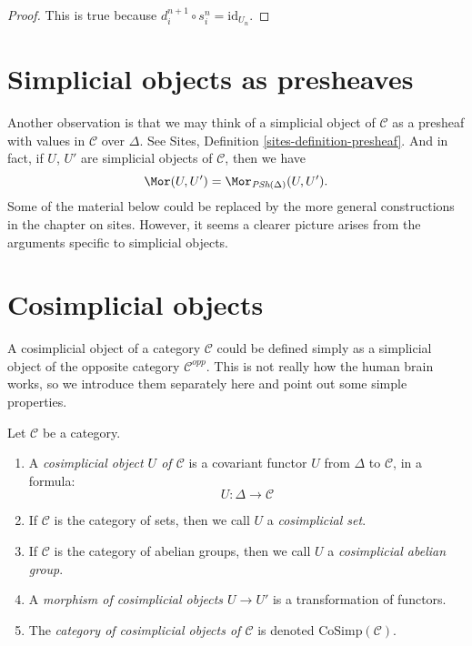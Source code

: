 \begin{proof}
This is true because $d_i^{n + 1} \circ s^n_i = \text{id}_{U_n}$.
\end{proof}

\section{Simplicial objects as presheaves}
\label{section-simplicial-presheaves}

\noindent
Another observation is that we may think of a simplicial
object of $\mathcal{C}$ as a presheaf with values in $\mathcal{C}$
over $\Delta$. See
Sites, Definition \ref{sites-definition-presheaf}.
And in fact, if $U$, $U'$ are simplicial objects
of $\mathcal{C}$, then we have
\begin{equation}
\label{equation-simplicial-set-presheaf}
\Mor(U, U') = \Mor_{\textit{PSh}(\Delta)}(U, U').
\end{equation}
Some of the material below could be replaced by the more
general constructions in the chapter on sites.
However, it seems a clearer picture arises from the
arguments specific to simplicial objects.
















\section{Cosimplicial objects}
\label{section-cosimplicial-object}

\noindent
A cosimplicial object of a category $\mathcal{C}$ could
be defined simply as a simplicial object of the
opposite category $\mathcal{C}^{opp}$. This is not
really how the human brain works, so we introduce
them separately here and point out some simple
properties.

\begin{definition}
\label{definition-cosimplicial-object}
Let $\mathcal{C}$ be a category.
\begin{enumerate}
\item A {\it cosimplicial object $U$ of $\mathcal{C}$}
is a covariant functor $U$ from $\Delta$ to
$\mathcal{C}$, in a formula:
$$
U : \Delta \longrightarrow \mathcal{C}
$$
\item If $\mathcal{C}$ is the category of sets, then we call
$U$ a {\it cosimplicial set}.
\item If $\mathcal{C}$ is the category of abelian groups,
then we call $U$ a {\it cosimplicial abelian group}.
\item A {\it morphism of cosimplicial objects $U \to U'$}
is a transformation of functors.
\item The {\it category of cosimplicial objects of $\mathcal{C}$}
is denoted $\text{CoSimp}(\mathcal{C})$.
\end{enumerate}
\end{definition}

